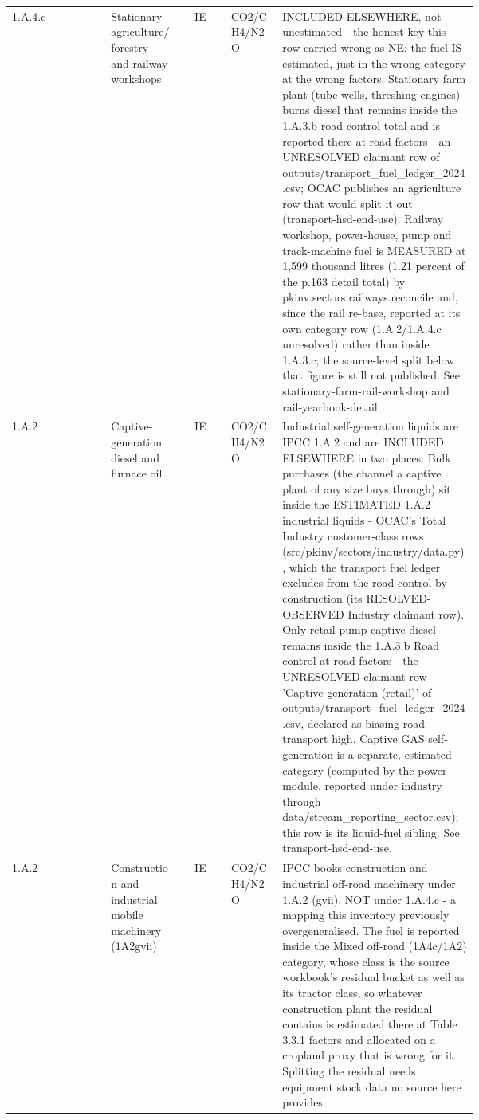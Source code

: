 {\begin{longtable}{@{}l>{\raggedright\arraybackslash}p{0.15\linewidth}c>{\raggedright\arraybackslash}p{0.11\linewidth}>{\raggedright\arraybackslash}p{0.42\linewidth}@{}}
1.A.4.c & Stationary agriculture/forestry and railway workshops & IE & CO2/\allowbreak CH4/\allowbreak N2O & INCLUDED ELSEWHERE, not unestimated - the honest key this row carried wrong as NE: the fuel IS estimated, just in the wrong category at the wrong factors. Stationary farm plant (tube wells, threshing engines) burns diesel that remains inside the 1.A.3.b road control total and is reported there at road factors - an UNRESOLVED claimant row of outputs/transport\_fuel\_ledger\_2024.csv; OCAC publishes an agriculture row that would split it out (transport-hsd-end-use). Railway workshop, power-house, pump and track-machine fuel is MEASURED at 1,599 thousand litres (1.21 percent of the p.163 detail total) by pkinv.sectors.railways.reconcile and, since the rail re-base, reported at its own category row (1.A.2/1.A.4.c unresolved) rather than inside 1.A.3.c; the source-level split below that figure is still not published. See stationary-farm-rail-workshop and rail-yearbook-detail. \\[2pt]
1.A.2 & Captive-generation diesel and furnace oil & IE & CO2/\allowbreak CH4/\allowbreak N2O & Industrial self-generation liquids are IPCC 1.A.2 and are INCLUDED ELSEWHERE in two places. Bulk purchases (the channel a captive plant of any size buys through) sit inside the ESTIMATED 1.A.2 industrial liquids - OCAC's Total Industry customer-class rows (src/pkinv/sectors/industry/data.py), which the transport fuel ledger excludes from the road control by construction (its RESOLVED-OBSERVED Industry claimant row). Only retail-pump captive diesel remains inside the 1.A.3.b Road control at road factors - the UNRESOLVED claimant row 'Captive generation (retail)' of outputs/transport\_fuel\_ledger\_2024.csv, declared as biasing road transport high. Captive GAS self-generation is a separate, estimated category (computed by the power module, reported under industry through data/stream\_reporting\_sector.csv); this row is its liquid-fuel sibling. See transport-hsd-end-use. \\[2pt]
1.A.2 & Construction and industrial mobile machinery (1A2gvii) & IE & CO2/\allowbreak CH4/\allowbreak N2O & IPCC books construction and industrial off-road machinery under 1.A.2 (gvii), NOT under 1.A.4.c - a mapping this inventory previously overgeneralised. The fuel is reported inside the Mixed off-road (1A4c/1A2) category, whose class is the source workbook's residual bucket as well as its tractor class, so whatever construction plant the residual contains is estimated there at Table 3.3.1 factors and allocated on a cropland proxy that is wrong for it. Splitting the residual needs equipment stock data no source here provides. \\[2pt]

\end{longtable}}

